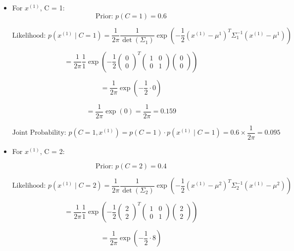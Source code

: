 \documentclass{article}
\begin{document}
\begin{itemize}

\item[\textbullet] For \( x^{(1)} \), C = 1:
\[
\text{Prior: } p(C = 1) = 0.6
\]

\[
\text{Likelihood: } p \left( x^{(1)} \mid C = 1 \right) = \frac{1}{2\pi} \frac{1}{\det(\Sigma_1)} \exp \left( -\frac{1}{2} \left( x^{(1)} - \mu^1 \right)^T \Sigma_1^{-1} \left( x^{(1)} - \mu^1 \right) \right)
\]

\[
= \frac{1}{2\pi} \frac{1}{1} \exp \left( -\frac{1}{2} \begin{pmatrix} 0 \\ 0 \end{pmatrix}^T \begin{pmatrix} 1 & 0 \\ 0 & 1 \end{pmatrix} \begin{pmatrix} 0 \\ 0 \end{pmatrix} \right)
\]

\[
= \frac{1}{2\pi} \exp \left( -\frac{1}{2} \cdot 0 \right) 
\]

\[
= \frac{1}{2\pi} \exp(0) = \frac{1}{2\pi} = 0.159
\]

\[
\text{Joint Probability: } p(C = 1, x^{(1)}) = p(C = 1) \cdot p(x^{(1)} \mid C = 1) = 0.6 \times \frac{1}{2\pi} = 0.095
\]
\newpage

 \item[\textbullet] For \( x^{(1)} \), C = 2: 

\[
\text{Prior: } p(C = 2) = 0.4
\]
 
\[
\text{Likelihood: } p \left( x^{(1)} \mid C = 2 \right) = \frac{1}{2\pi} \frac{1}{\det(\Sigma_2)} \exp \left( -\frac{1}{2} \left( x^{(1)} - \mu^2 \right)^T \Sigma_2^{-1} \left( x^{(1)} - \mu^2 \right) \right)
\]

\[
= \frac{1}{2\pi} \frac{1}{1} \exp \left( -\frac{1}{2} \begin{pmatrix} 2 \\ 2 \end{pmatrix}^T \begin{pmatrix} 1 & 0 \\ 0 & 1 \end{pmatrix} \begin{pmatrix} 2 \\ 2 \end{pmatrix} \right)
\]

\[
= \frac{1}{2\pi} \exp \left( -\frac{1}{2} \cdot 8 \right) 
\]


\end{itemize}
\end{document}
